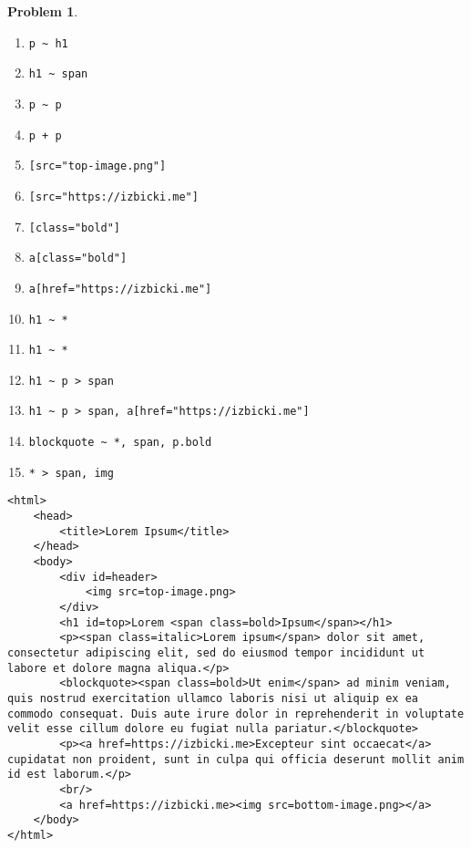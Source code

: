 \documentclass[10pt]{article}
\theoremstyle{definition}
\newtheorem{problem}{Problem}
\begin{document}
\begin{problem}
\begin{enumerate}[before=\setlength{\baselineskip}{7mm}]
    \item
    \lstinline{p ~ h1}

    \item
    \lstinline{h1 ~ span}

    \item
    \lstinline{p ~ p}

    \item
    \lstinline{p + p}

    \item
    \lstinline{[src="top-image.png"]}

    \item
    \lstinline{[src="https://izbicki.me"]}

    \item
    \lstinline{[class="bold"]}

    \item
    \lstinline{a[class="bold"]}

    \item
    \lstinline{a[href="https://izbicki.me"]}

    \item
    \lstinline{h1 ~ *}

    \item
    \lstinline{h1 ~ *}

    \item
    \lstinline{h1 ~ p > span}

    \item
    \lstinline{h1 ~ p > span, a[href="https://izbicki.me"]}

    \item
    \lstinline{blockquote ~ *, span, p.bold}

    \item
    \lstinline{* > span, img}

\end{enumerate}
\end{problem}

\newpage
\begin{lstlisting}
<html>
    <head>
        <title>Lorem Ipsum</title>
    </head>
    <body>
        <div id=header>
            <img src=top-image.png>
        </div>
        <h1 id=top>Lorem <span class=bold>Ipsum</span></h1>
        <p><span class=italic>Lorem ipsum</span> dolor sit amet, consectetur adipiscing elit, sed do eiusmod tempor incididunt ut labore et dolore magna aliqua.</p>
        <blockquote><span class=bold>Ut enim</span> ad minim veniam, quis nostrud exercitation ullamco laboris nisi ut aliquip ex ea commodo consequat. Duis aute irure dolor in reprehenderit in voluptate velit esse cillum dolore eu fugiat nulla pariatur.</blockquote>
        <p><a href=https://izbicki.me>Excepteur sint occaecat</a> cupidatat non proident, sunt in culpa qui officia deserunt mollit anim id est laborum.</p>
        <br/>
        <a href=https://izbicki.me><img src=bottom-image.png></a>
    </body>
</html>
\end{lstlisting}
\end{document}
